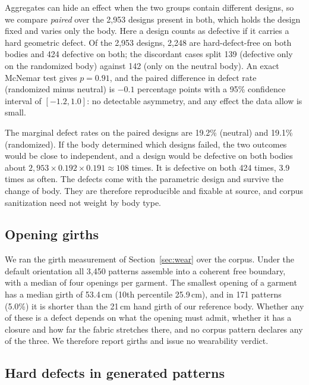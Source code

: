 \documentclass[10pt,twocolumn]{article}
\begin{document}
Aggregates can hide an effect when the two groups contain different designs, so
we compare \emph{paired} over the 2{,}953 designs present in both, which holds
the design fixed and varies only the body. Here a design counts as defective
if it carries a hard geometric defect. Of the 2{,}953 designs, 2{,}248 are
hard-defect-free on both bodies and 424 defective on both; the discordant cases
split 139 (defective only on the randomized body) against 142 (only on the
neutral body). An exact McNemar test gives $p = 0.91$, and the paired
difference in defect rate (randomized minus neutral) is $-0.1$ percentage
points with a 95\% confidence interval of $[-1.2, 1.0]$: no detectable
asymmetry, and any effect the data allow is small.

The marginal defect rates on the paired designs are 19.2\% (neutral) and
19.1\% (randomized). If the body determined which designs failed, the two
outcomes would be close to independent, and a design would be defective on
both bodies about $2{,}953 \times 0.192 \times 0.191 \approx 108$ times. It is
defective on both 424 times, 3.9 times as often. The defects come with the
parametric design and survive the change of body. They are therefore
reproducible and fixable at source, and corpus sanitization need not weight by
body type.

\subsection{Opening girths}
\label{sec:res-wear}

We ran the girth measurement of Section~\ref{sec:wear} over the corpus. Under
the default orientation all 3{,}450 patterns assemble into a coherent
free boundary, with a median of four openings per garment. The smallest opening
of a garment has a median girth of 53.4\,cm (10th percentile 25.9\,cm), and in
171 patterns (5.0\%) it is shorter than the 21\,cm hand girth of our reference
body. Whether any of these is a defect depends on what the opening must admit,
whether it has a closure and how far the fabric stretches there, and no corpus
pattern declares any of the three. We therefore report girths and issue no
wearability verdict.

\subsection{Hard defects in generated patterns}
\label{sec:res-gen}
\end{document}
